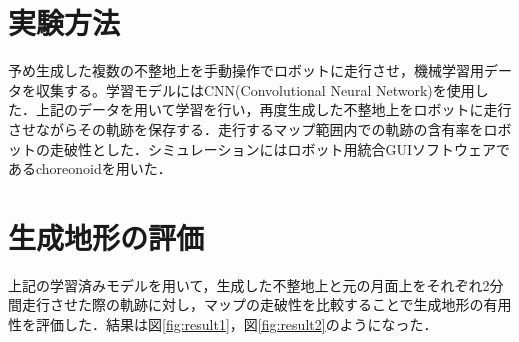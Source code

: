 \documentclass[a4paper,twocolumn,9pt]{jsarticle}
\begin{document}
\section{実験方法}
予め生成した複数の不整地上を手動操作でロボットに走行させ，機械学習用データを収集する。学習モデルにはCNN(Convolutional Neural Network)を使用した．上記のデータを用いて学習を行い，再度生成した不整地上をロボットに走行させながらその軌跡を保存する．走行するマップ範囲内での軌跡の含有率をロボットの走破性とした\cite{bunken2}．シミュレーションにはロボット用統合GUIソフトウェアであるchoreonoidを用いた．


\section{生成地形の評価}
上記の学習済みモデルを用いて，生成した不整地上と元の月面上をそれぞれ2分間走行させた際の軌跡に対し，マップの走破性を比較することで生成地形の有用性を評価した．結果は図\ref{fig:result1}，図\ref{fig:result2}のようになった．
\end{document}
